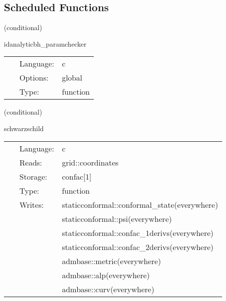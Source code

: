 \documentclass{article}
\begin{document}
\subsection*{Scheduled Functions}
\vspace{5mm}

   (conditional) 

\hspace{5mm} idanalyticbh\_paramchecker 

\hspace{5mm}{\it construct parameters for analytic black hole solutions } 


\hspace{5mm}

 \begin{tabular*}{160mm}{cll} 
~ & Language:  & c \\ 
~ & Options:  & global \\ 
~ & Type:  & function \\ 
\end{tabular*} 


\vspace{5mm}

   (conditional) 

\hspace{5mm} schwarzschild 

\hspace{5mm}{\it construct initial data for a single schwarzschild black hole } 


\hspace{5mm}

 \begin{tabular*}{160mm}{cll} 
~ & Language:  & c \\ 
~ & Reads:  & grid::coordinates \\ 
~ & Storage:  & confac[1] \\ 
~ & Type:  & function \\ 
~ & Writes:  & staticconformal::conformal\_state(everywhere) \\ 
~& ~ &staticconformal::psi(everywhere)\\ 
~& ~ &staticconformal::confac\_1derivs(everywhere)\\ 
~& ~ &staticconformal::confac\_2derivs(everywhere)\\ 
~& ~ &admbase::metric(everywhere)\\ 
~& ~ &admbase::alp(everywhere)\\ 
~& ~ &admbase::curv(everywhere)\\ 
\end{tabular*} 
\end{document}
